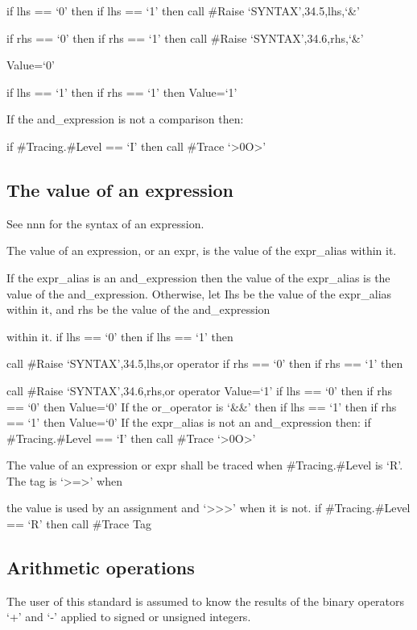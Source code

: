 if lhs == `0' then if lhs == `1' then call \#Raise
`SYNTAX',34.5,lhs,`\&'

if rhs == `0' then if rhs == `1' then call \#Raise
`SYNTAX',34.6,rhs,`\&'

Value=`0'

if lhs == `1' then if rhs == `1' then Value=`1'

If the and\_expression is not a comparison then:

if \#Tracing.\#Level == `I' then call \#Trace
`\textgreater0O\textgreater{}'

\subsection{The value of an
expression}\label{the-value-of-an-expression}

See nnn for the syntax of an expression.

The value of an expression, or an expr, is the value of the expr\_alias
within it.

If the expr\_alias is an and\_expression then the value of the
expr\_alias is the value of the and\_expression. Otherwise, let Ihs be
the value of the expr\_alias within it, and rhs be the value of the
and\_expression

within it. if lhs == `0' then if lhs == `1' then

call \#Raise `SYNTAX',34.5,lhs,or operator if rhs == `0' then if rhs ==
`1' then

call \#Raise `SYNTAX',34.6,rhs,or operator Value=`1' if lhs == `0' then
if rhs == `0' then Value=`0' If the or\_operator is `\&\&' then if lhs
== `1' then if rhs == `1' then Value=`0' If the expr\_alias is not an
and\_expression then: if \#Tracing.\#Level == `I' then call \#Trace
`\textgreater0O\textgreater{}'

The value of an expression or expr shall be traced when
\#Tracing.\#Level is `R'. The tag is `\textgreater=\textgreater{}' when

the value is used by an assignment and
`\textgreater\textgreater\textgreater{}' when it is not. if
\#Tracing.\#Level == `R' then call \#Trace Tag

\subsection{Arithmetic operations}\label{arithmetic-operations}

The user of this standard is assumed to know the results of the binary
operators `+' and `-' applied to signed or unsigned integers.

